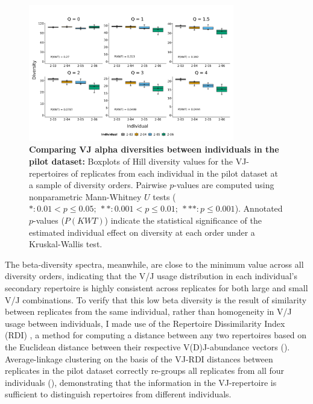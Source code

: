 \begin{figure}
\centering
\includegraphics[width = 0.8\textwidth]{_Figures/png/pilot-vj-diversity-solo-box}
\caption[Comparing VJ alpha diversities between individuals in the \igseq pilot dataset]{\textbf{Comparing VJ alpha diversities between individuals in the \igseq pilot dataset:} Boxplots of Hill diversity values for the VJ-repertoires of replicates from each individual in the \igseq pilot dataset at a sample of diversity orders. Pairwise $p$-values are computed using nonparametric Mann-Whitney $U$ tests ($*: 0.01 < p \leq 0.05;~**: 0.001 < p \leq 0.01;~***: p \leq 0.001$). Annotated $p$-values ($P(KWT)$) indicate the statistical significance of the estimated individual effect on diversity at each order under a Kruskal-Wallis test.}
\label{fig:igseq-pilot-clone-diversity-solo-box}
\end{figure}

The beta-diversity spectra, meanwhile, are close to the minimum value across all diversity orders, indicating that the V/J usage distribution in each individual's secondary repertoire is highly consistent across replicates for both large and small V/J combinations. To verify that this low beta diversity is the result of similarity between replicates from the same individual, rather than homogeneity in V/J usage between individuals, I made use of the Repertoire Dissimilarity Index (RDI) \parencite{bolen2017rdi}, a method for computing a distance between any two repertoires based on the Euclidean distance between their respective V(D)J-abundance vectors (). Average-linkage clustering on the basis of the VJ-RDI distances between replicates in the pilot dataset correctly re-groups all replicates from all four individuals (), demonstrating that the information in the VJ-repertoire is sufficient to distinguish repertoires from different individuals.

